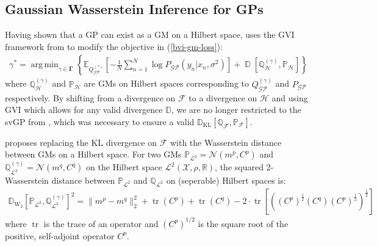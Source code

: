 \documentclass{article}
\newcommand{\KLD}{\operatorname{\mathbb{D}_{KL}}}
\newcommand{\D}{\operatorname{\mathbb{D}}}
\newcommand{\WD}{\operatorname{\mathbb{D}_{W_2}}}
\newcommand{\tr}{\operatorname{tr}}
\newcommand{\GP}{\operatorname{\mathcal{GP}}}
\DeclareMathOperator*{\argmin}{arg\,min}
\numberwithin{equation}{section}
\begin{document}
\subsection{Gaussian Wasserstein Inference for GPs}
Having shown that a GP can exist as a GM on a Hilbert space, \cite{wild2022generalized} uses the GVI framework from \cite{knoblauch2022optimization} to modify the objective in (\ref{bvi-gm-loss}):
\begin{align}
    \label{gwi-objective}
    \gamma^* = \argmin_{\gamma \in \boldsymbol{\Gamma}}\left\{ \mathbb{E}_{Q^{(\gamma)}_{\GP}}\left[- \frac{1}{N}\sum_{n=1}^N \log P_{\GP}\left(y_n \vert x_n, \sigma^2\right) \right] + \D \left[\mathbb{Q}^{(\gamma)}_{\mathcal{H}}, \mathbb{P}_{\mathcal{H}} \right]\right\}
\end{align}
where $\mathbb{Q}^{(\gamma)}_{\mathcal{H}}$ and $\mathbb{P}_{\mathcal{H}}$ are GMs on Hilbert spaces corresponding to $Q^{(\gamma)}_{\GP}$ and $P_{\GP}$ respectively. By shifting from a divergence on $\mathcal{F}$ to a divergence on $\mathcal{H}$ and using GVI which allows for any valid divergence $\mathbb{D}$, we are no longer restricted to the svGP from \cite{titsias2009variational}, which was necessary to ensure a valid $\KLD\left[\mathbb{Q}_{\mathcal{F}},  \mathbb{P}_{\mathcal{F}}\right]$. 

\cite{wild2022generalized} proposes replacing the KL divergence on $\mathcal{F}$ with the Wasserstein distance between GMs on a Hilbert space. For two GMs $\mathbb{P}_{\mathcal{L}^2} = \mathcal{N}(m^p, C^p)$ and $\mathbb{Q}^{(\gamma)}_{\mathcal{L}^2} = \mathcal{N}(m^q, C^q)$ on the Hilbert space $\mathcal{L}^2(\mathcal{X}, \rho, \mathbb{R})$, the squared 2-Wasserstein distance between $\mathbb{P}_{\mathcal{L}^2}$ and $\mathbb{Q}_{\mathcal{L}^2}$ on (seperable) Hilbert spaces is:
\begin{align}
    \label{wasserstein-distance}
    \WD \left[\mathbb{P}_{\mathcal{L}^2}, \mathbb{Q}^{(\gamma)}_{\mathcal{L}^2}\right]^2 = \| m^p - m^q\|_2^2 + \tr(C^p) + \tr(C^q) - 2 \cdot \tr \left[ \left( \left(C^p\right)^{\frac{1}{2}} \left(C^q\right) \left(C^p\right)^{\frac{1}{2}}\right)^{\frac{1}{2}}\right]
\end{align}
where $\tr$ is the trace of an operator and $\left(C^p\right)^{1/2}$ is the square root of the positive, self-adjoint operator $C^p$. 
\end{document}
